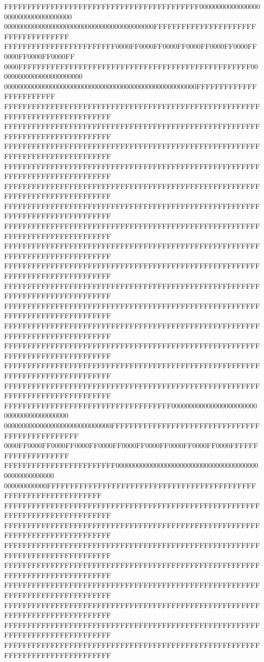 FFFFFFFFFFFFFFFFFFFFFFFFFFFFFFFFFFFFFFFFFF000000000000000000000000000000000000
000000000000000000000000000000000000000000FFFFFFFFFFFFFFFFFFFFFFFFFFFFFFFFFFFF
FFFFFFFFFFFFFFFFFFFFFFFF0000FF0000FF0000FF0000FF0000FF0000FF0000FF0000FF0000FF
0000FFFFFFFFFFFFFFFFFFFFFFFFFFFFFFFFFFFFFFFFFFFFFFFFFF000000000000000000000000
000000000000000000000000000000000000000000000000000000FFFFFFFFFFFFFFFFFFFFFFFF
FFFFFFFFFFFFFFFFFFFFFFFFFFFFFFFFFFFFFFFFFFFFFFFFFFFFFFFFFFFFFFFFFFFFFFFFFFFFFF
FFFFFFFFFFFFFFFFFFFFFFFFFFFFFFFFFFFFFFFFFFFFFFFFFFFFFFFFFFFFFFFFFFFFFFFFFFFFFF
FFFFFFFFFFFFFFFFFFFFFFFFFFFFFFFFFFFFFFFFFFFFFFFFFFFFFFFFFFFFFFFFFFFFFFFFFFFFFF
FFFFFFFFFFFFFFFFFFFFFFFFFFFFFFFFFFFFFFFFFFFFFFFFFFFFFFFFFFFFFFFFFFFFFFFFFFFFFF
FFFFFFFFFFFFFFFFFFFFFFFFFFFFFFFFFFFFFFFFFFFFFFFFFFFFFFFFFFFFFFFFFFFFFFFFFFFFFF
FFFFFFFFFFFFFFFFFFFFFFFFFFFFFFFFFFFFFFFFFFFFFFFFFFFFFFFFFFFFFFFFFFFFFFFFFFFFFF
FFFFFFFFFFFFFFFFFFFFFFFFFFFFFFFFFFFFFFFFFFFFFFFFFFFFFFFFFFFFFFFFFFFFFFFFFFFFFF
FFFFFFFFFFFFFFFFFFFFFFFFFFFFFFFFFFFFFFFFFFFFFFFFFFFFFFFFFFFFFFFFFFFFFFFFFFFFFF
FFFFFFFFFFFFFFFFFFFFFFFFFFFFFFFFFFFFFFFFFFFFFFFFFFFFFFFFFFFFFFFFFFFFFFFFFFFFFF
FFFFFFFFFFFFFFFFFFFFFFFFFFFFFFFFFFFFFFFFFFFFFFFFFFFFFFFFFFFFFFFFFFFFFFFFFFFFFF
FFFFFFFFFFFFFFFFFFFFFFFFFFFFFFFFFFFFFFFFFFFFFFFFFFFFFFFFFFFFFFFFFFFFFFFFFFFFFF
FFFFFFFFFFFFFFFFFFFFFFFFFFFFFFFFFFFFFFFFFFFFFFFFFFFFFFFFFFFFFFFFFFFFFFFFFFFFFF
FFFFFFFFFFFFFFFFFFFFFFFFFFFFFFFFFFFFFFFFFFFFFFFFFFFFFFFFFFFFFFFFFFFFFFFFFFFFFF
FFFFFFFFFFFFFFFFFFFFFFFFFFFFFFFFFFFFFFFFFFFFFFFFFFFFFFFFFFFFFFFFFFFFFFFFFFFFFF
FFFFFFFFFFFFFFFFFFFFFFFFFFFFFFFFFFFFFFFFFFFFFFFFFFFFFFFFFFFFFFFFFFFFFFFFFFFFFF
FFFFFFFFFFFFFFFFFFFFFFFFFFFFFFFFFFFF000000000000000000000000000000000000000000
000000000000000000000000000000FFFFFFFFFFFFFFFFFFFFFFFFFFFFFFFFFFFFFFFFFFFFFFFF
0000FF0000FF0000FF0000FF0000FF0000FF0000FF0000FF0000FF0000FFFFFFFFFFFFFFFFFFFF
FFFFFFFFFFFFFFFFFFFFFFFF000000000000000000000000000000000000000000000000000000
000000000000FFFFFFFFFFFFFFFFFFFFFFFFFFFFFFFFFFFFFFFFFFFFFFFFFFFFFFFFFFFFFFFFFF
FFFFFFFFFFFFFFFFFFFFFFFFFFFFFFFFFFFFFFFFFFFFFFFFFFFFFFFFFFFFFFFFFFFFFFFFFFFFFF
FFFFFFFFFFFFFFFFFFFFFFFFFFFFFFFFFFFFFFFFFFFFFFFFFFFFFFFFFFFFFFFFFFFFFFFFFFFFFF
FFFFFFFFFFFFFFFFFFFFFFFFFFFFFFFFFFFFFFFFFFFFFFFFFFFFFFFFFFFFFFFFFFFFFFFFFFFFFF
FFFFFFFFFFFFFFFFFFFFFFFFFFFFFFFFFFFFFFFFFFFFFFFFFFFFFFFFFFFFFFFFFFFFFFFFFFFFFF
FFFFFFFFFFFFFFFFFFFFFFFFFFFFFFFFFFFFFFFFFFFFFFFFFFFFFFFFFFFFFFFFFFFFFFFFFFFFFF
FFFFFFFFFFFFFFFFFFFFFFFFFFFFFFFFFFFFFFFFFFFFFFFFFFFFFFFFFFFFFFFFFFFFFFFFFFFFFF
FFFFFFFFFFFFFFFFFFFFFFFFFFFFFFFFFFFFFFFFFFFFFFFFFFFFFFFFFFFFFFFFFFFFFFFFFFFFFF
FFFFFFFFFFFFFFFFFFFFFFFFFFFFFFFFFFFFFFFFFFFFFFFFFFFFFFFFFFFFFFFFFFFFFFFFFFFFFF
